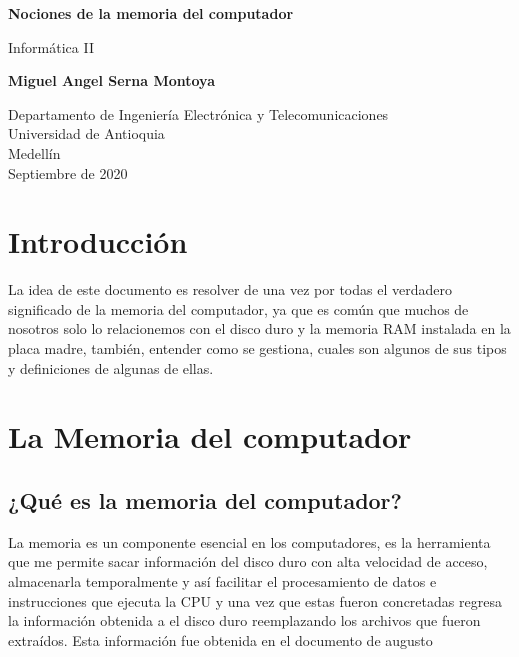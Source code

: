 \documentclass{article}
\begin{document}
\begin{titlepage}
    \begin{center}
        \vspace*{1cm}
            
        \Huge
        \textbf{Nociones de la memoria del computador}
            
        \vspace{0.5cm}
        \LARGE
        Informática II
            
        \vspace{1.5cm}
            
        \textbf{Miguel Angel Serna Montoya}
            
        \vfill
            
        \vspace{0.8cm}
            
        \Large
        Departamento de Ingeniería Electrónica y Telecomunicaciones\\
        Universidad de Antioquia\\
        Medellín\\
        Septiembre de 2020
            
    \end{center}
\end{titlepage}

\tableofcontents
\newpage
\section{Introducción} \label{Introducción}
La idea de este documento es resolver de una vez por todas el verdadero significado de la memoria del computador, ya que es común que muchos de nosotros solo lo relacionemos con el disco duro y la memoria RAM instalada en la placa madre, también, entender como se gestiona, cuales son algunos de sus tipos y definiciones de algunas de ellas.

\section{La Memoria del computador}
\subsection{¿Qué es la memoria del computador?}
La memoria es un componente esencial en los computadores, es la herramienta que me permite sacar información del disco duro con alta velocidad de acceso, almacenarla temporalmente y así facilitar el procesamiento de datos e instrucciones que ejecuta la CPU y una vez que estas fueron concretadas regresa la información obtenida a el disco duro reemplazando los archivos que fueron extraídos. Esta información fue obtenida en el documento de augusto \cite{Referencia}
\end{document}
